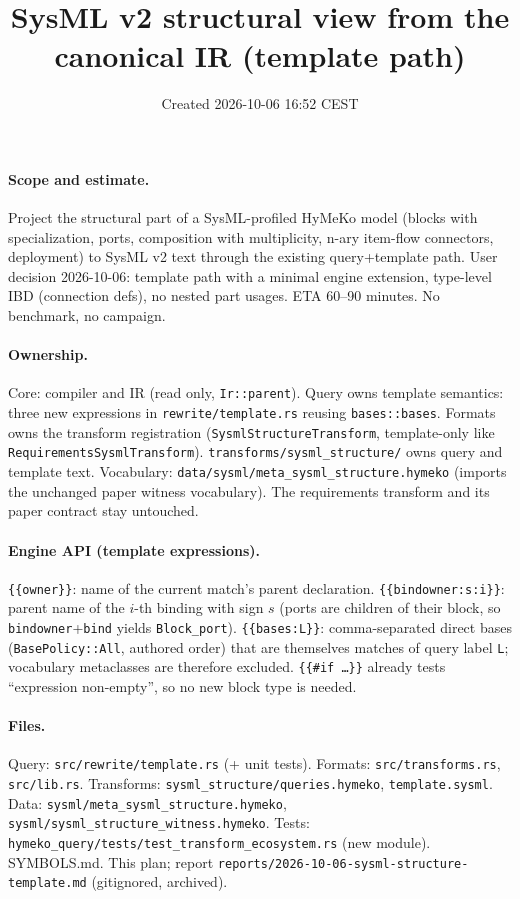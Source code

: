 \documentclass[11pt,a4paper]{article}
\title{SysML v2 structural view from the canonical IR (template path)}
\date{Created 2026-10-06 16:52 CEST}
\begin{document}
\maketitle
\paragraph{Scope and estimate.} Project the structural part of a SysML-profiled HyMeKo
model (blocks with specialization, ports, composition with multiplicity, n-ary item-flow
connectors, deployment) to SysML v2 text through the existing query+template path.
User decision 2026-10-06: template path with a minimal engine extension, type-level IBD
(connection defs), no nested part usages. ETA 60--90 minutes. No benchmark, no campaign.
\paragraph{Ownership.} Core: compiler and IR (read only, \texttt{Ir::parent}). Query owns
template semantics: three new expressions in \texttt{rewrite/template.rs} reusing
\texttt{bases::bases}. Formats owns the transform registration
(\texttt{SysmlStructureTransform}, template-only like \texttt{RequirementsSysmlTransform}).
\texttt{transforms/sysml\_structure/} owns query and template text. Vocabulary:
\texttt{data/sysml/meta\_sysml\_structure.hymeko} (imports the unchanged paper witness
vocabulary). The requirements transform and its paper contract stay untouched.
\paragraph{Engine API (template expressions).}
\texttt{\{\{owner\}\}}: name of the current match's parent declaration.
\texttt{\{\{bindowner:s:i\}\}}: parent name of the $i$-th binding with sign $s$
(ports are children of their block, so \texttt{bindowner}+\texttt{bind} yields
\texttt{Block\_port}). \texttt{\{\{bases:L\}\}}: comma-separated direct bases
(\texttt{BasePolicy::All}, authored order) that are themselves matches of query label
\texttt{L}; vocabulary metaclasses are therefore excluded. \texttt{\{\{\#if \ldots\}\}}
already tests ``expression non-empty'', so no new block type is needed.
\paragraph{Files.} Query: \texttt{src/rewrite/template.rs} (+ unit tests). Formats:
\texttt{src/transforms.rs}, \texttt{src/lib.rs}. Transforms:
\texttt{sysml\_structure/queries.hymeko}, \texttt{template.sysml}. Data:
\texttt{sysml/meta\_sysml\_structure.hymeko}, \texttt{sysml/sysml\_structure\_witness.hymeko}.
Tests: \texttt{hymeko\_query/tests/test\_transform\_ecosystem.rs} (new module). SYMBOLS.md.
This plan; report \texttt{reports/2026-10-06-sysml-structure-template.md} (gitignored, archived).
\end{document}
